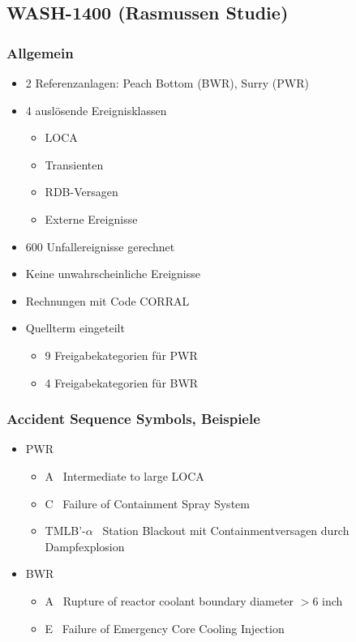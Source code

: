 \documentclass[12pt]{article}
\begin{document}
\subsection{WASH-1400 (Rasmussen Studie)}

\subsubsection{Allgemein}
\begin{itemize}[noitemsep]
	\item 2 Referenzanlagen: Peach Bottom (BWR), Surry (PWR)
	\item 4 auslösende Ereignisklassen
		\begin{itemize}[noitemsep]
			\item LOCA
			\item Transienten
			\item RDB-Versagen
			\item Externe Ereignisse
		\end{itemize}
	\item 600 Unfallereignisse gerechnet
	\item Keine unwahrscheinliche Ereignisse
	\item Rechnungen mit Code CORRAL
	\item Quellterm eingeteilt
		\begin{itemize}[noitemsep]
			\item 9 Freigabekategorien für PWR
			\item 4 Freigabekategorien für BWR
		\end{itemize}
\end{itemize}

\subsubsection{Accident Sequence Symbols, Beispiele}
\begin{itemize}[noitemsep]
	\item PWR
		\begin{itemize}[noitemsep]
			\item A \textrightarrow\ Intermediate to large LOCA
			\item C \textrightarrow\ Failure of Containment Spray System
			\item TMLB'-\(\alpha\) \textrightarrow\ Station Blackout mit Containmentversagen durch Dampfexplosion
		\end{itemize}
	\item BWR
		\begin{itemize}[noitemsep]
			\item A \textrightarrow\ Rupture of reactor coolant boundary diameter \(>6\) inch
			\item E \textrightarrow\ Failure of Emergency Core Cooling Injection
		\end{itemize}
\end{itemize}
\end{document}
